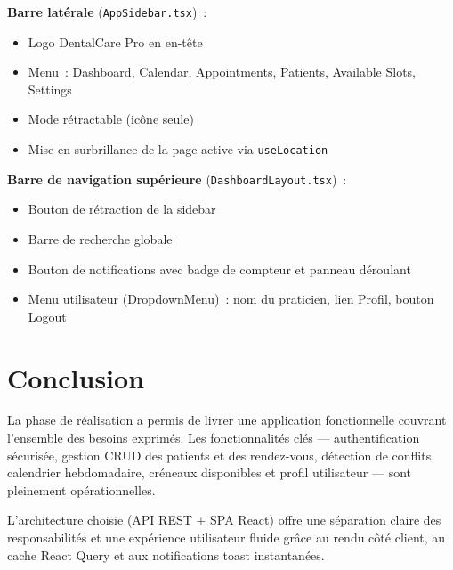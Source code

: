 \textbf{Barre latérale} (\texttt{AppSidebar.tsx})~:
\begin{itemize}
    \item Logo \og DentalCare Pro \fg{} en en-tête
    \item Menu~: Dashboard, Calendar, Appointments, Patients, Available Slots, Settings
    \item Mode rétractable (icône seule)
    \item Mise en surbrillance de la page active via \texttt{useLocation}
\end{itemize}

\textbf{Barre de navigation supérieure} (\texttt{DashboardLayout.tsx})~:
\begin{itemize}
    \item Bouton de rétraction de la sidebar
    \item Barre de recherche globale
    \item Bouton de notifications avec badge de compteur et panneau déroulant
    \item Menu utilisateur (DropdownMenu)~: nom du praticien, lien Profil, bouton Logout
\end{itemize}

\section{Conclusion}

La phase de réalisation a permis de livrer une application fonctionnelle couvrant l'ensemble des besoins exprimés. Les fonctionnalités clés --- authentification sécurisée, gestion CRUD des patients et des rendez-vous, détection de conflits, calendrier hebdomadaire, créneaux disponibles et profil utilisateur --- sont pleinement opérationnelles.

L'architecture choisie (API REST + SPA React) offre une séparation claire des responsabilités et une expérience utilisateur fluide grâce au rendu côté client, au cache React Query et aux notifications toast instantanées.
